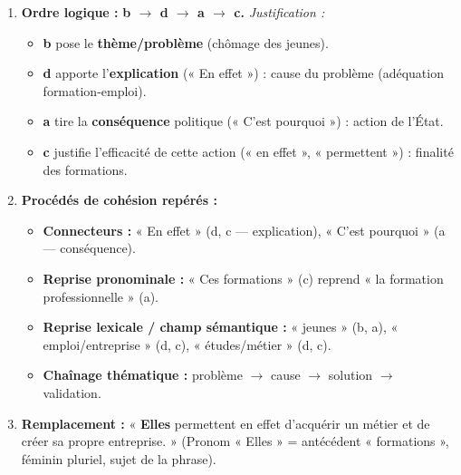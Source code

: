 \documentclass[11pt]{article}
\begin{document}
\begin{corrige}
\begin{enumerate}
\item \textbf{Ordre logique :} \textbf{b $\rightarrow$ d $\rightarrow$ a $\rightarrow$ c.}
\textit{Justification :} 
\begin{itemize}
\item \textbf{b} pose le \textbf{thème/problème} (chômage des jeunes).
\item \textbf{d} apporte l'\textbf{explication} (« En effet ») : cause du problème (adéquation formation-emploi).
\item \textbf{a} tire la \textbf{conséquence} politique (« C'est pourquoi ») : action de l'État.
\item \textbf{c} justifie l'efficacité de cette action (« en effet », « permettent ») : finalité des formations.
\end{itemize}
\item \textbf{Procédés de cohésion repérés :}
\begin{itemize}
\item \textbf{Connecteurs :} « En effet » (d, c — explication), « C'est pourquoi » (a — conséquence).
\item \textbf{Reprise pronominale :} « Ces formations » (c) reprend « la formation professionnelle » (a).
\item \textbf{Reprise lexicale / champ sémantique :} « jeunes » (b, a), « emploi/entreprise » (d, c), « études/métier » (d, c).
\item \textbf{Chaînage thématique :} problème $\rightarrow$ cause $\rightarrow$ solution $\rightarrow$ validation.
\end{itemize}
\item \textbf{Remplacement :} « \textbf{Elles} permettent en effet d'acquérir un métier et de créer sa propre entreprise. » (Pronom « Elles » = antécédent « formations », féminin pluriel, sujet de la phrase).
\end{enumerate}
\end{corrige}
\end{document}
